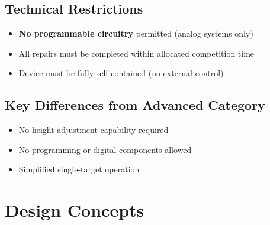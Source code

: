 \documentclass{article}
\begin{document}
\subsection{Technical Restrictions}
\begin{itemize}[itemsep=-0.7mm,topsep=0pt]
	\item \textbf{No programmable circuitry} permitted (analog systems only)
	\item All repairs must be completed within allocated competition time
	\item Device must be fully self-contained (no external control)
\end{itemize}


\subsection*{Key Differences from Advanced Category}
\begin{itemize}[itemsep=-0.7mm]
	\item No height adjustment capability required
	\item No programming or digital components allowed
	\item Simplified single-target operation
\end{itemize}


\newpage{}
\section{Design Concepts}
\end{document}
